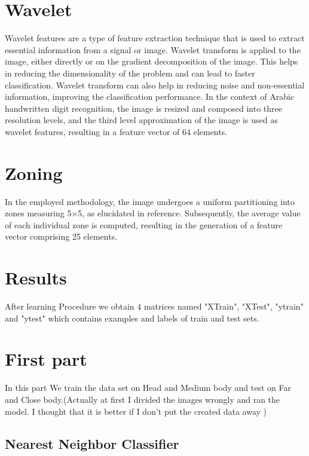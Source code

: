 \documentclass[9pt,twocolumn]{paper-template}
\begin{document}
\section*{Wavelet}


Wavelet features are a type of feature extraction technique that is used to extract essential information from a signal or image. Wavelet transform is applied to the image, either directly or on the gradient decomposition of the image. This helps in reducing the dimensionality of the problem and can lead to faster classification. Wavelet transform can also help in reducing noise and non-essential information, improving the classification performance. In the context of Arabic handwritten digit recognition, the image is resized and composed into three resolution levels, and the third level approximation of the image is used as wavelet features, resulting in a feature vector of 64 elements.

\section*{Zoning}

In the employed methodology, the image undergoes a uniform partitioning into zones measuring 5×5, as elucidated in reference. Subsequently, the average value of each individual zone is computed, resulting in the generation of a feature vector comprising 25 elements. 

\section*{Results}

After learning Procedure we obtain 4 matrices named "XTrain", "XTest", "ytrain" and "ytest" which contains examples and labels of train and test sets.

\section{First part}



In this part We train the data set on Head and Medium body and test on Far and Close body.(Actually at first I divided the images wrongly and ran the model. I thought that it is better if I don't put the created data away )


\subsection*{Nearest Neighbor Classifier}
\end{document}
